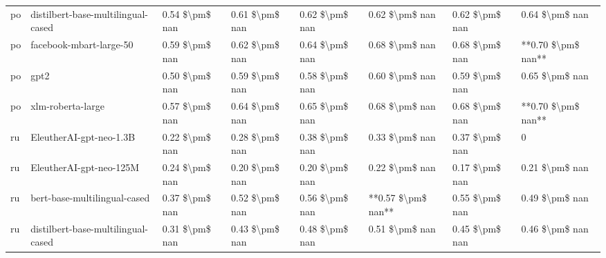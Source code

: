\begin{tabular}{llllllll}
      po & distilbert-base-multilingual-cased & 0.54 \$\textbackslash pm\$ nan &            0.61 \$\textbackslash pm\$ nan &        0.62 \$\textbackslash pm\$ nan &         0.62 \$\textbackslash pm\$ nan &                          0.62 \$\textbackslash pm\$ nan &     0.64 \$\textbackslash pm\$ nan \\
      po &            facebook-mbart-large-50 & 0.59 \$\textbackslash pm\$ nan &            0.62 \$\textbackslash pm\$ nan &        0.64 \$\textbackslash pm\$ nan &         0.68 \$\textbackslash pm\$ nan &                          0.68 \$\textbackslash pm\$ nan & **0.70 \$\textbackslash pm\$ nan** \\
      po &                               gpt2 & 0.50 \$\textbackslash pm\$ nan &            0.59 \$\textbackslash pm\$ nan &        0.58 \$\textbackslash pm\$ nan &         0.60 \$\textbackslash pm\$ nan &                          0.59 \$\textbackslash pm\$ nan &     0.65 \$\textbackslash pm\$ nan \\
      po &                  xlm-roberta-large & 0.57 \$\textbackslash pm\$ nan &            0.64 \$\textbackslash pm\$ nan &        0.65 \$\textbackslash pm\$ nan &         0.68 \$\textbackslash pm\$ nan &                          0.68 \$\textbackslash pm\$ nan & **0.70 \$\textbackslash pm\$ nan** \\
      ru &            EleutherAI-gpt-neo-1.3B & 0.22 \$\textbackslash pm\$ nan &            0.28 \$\textbackslash pm\$ nan &        0.38 \$\textbackslash pm\$ nan &         0.33 \$\textbackslash pm\$ nan &                          0.37 \$\textbackslash pm\$ nan &                  0 \\
      ru &            EleutherAI-gpt-neo-125M & 0.24 \$\textbackslash pm\$ nan &            0.20 \$\textbackslash pm\$ nan &        0.20 \$\textbackslash pm\$ nan &         0.22 \$\textbackslash pm\$ nan &                          0.17 \$\textbackslash pm\$ nan &     0.21 \$\textbackslash pm\$ nan \\
      ru &       bert-base-multilingual-cased & 0.37 \$\textbackslash pm\$ nan &            0.52 \$\textbackslash pm\$ nan &        0.56 \$\textbackslash pm\$ nan &     **0.57 \$\textbackslash pm\$ nan** &                          0.55 \$\textbackslash pm\$ nan &     0.49 \$\textbackslash pm\$ nan \\
      ru & distilbert-base-multilingual-cased & 0.31 \$\textbackslash pm\$ nan &            0.43 \$\textbackslash pm\$ nan &        0.48 \$\textbackslash pm\$ nan &         0.51 \$\textbackslash pm\$ nan &                          0.45 \$\textbackslash pm\$ nan &     0.46 \$\textbackslash pm\$ nan \\

\end{tabular}
